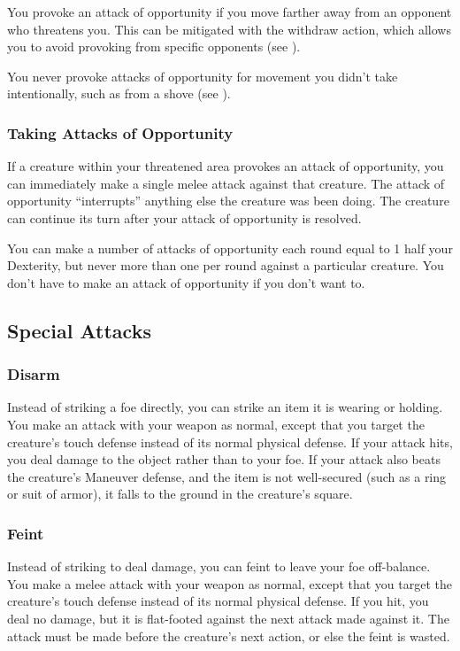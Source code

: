  You provoke an attack of opportunity if you move farther away from an opponent who threatens you. This can be mitigated with the withdraw action, which allows you to avoid provoking from specific opponents (see ).

 You never provoke attacks of opportunity for movement you didn't take intentionally, such as from a shove (see ).

\subsubsection{Taking Attacks of Opportunity}
If a creature within your threatened area provokes an attack of opportunity, you can immediately make a single melee attack against that creature. The attack of opportunity ``interrupts'' anything else the creature was been doing. The creature can continue its turn after your attack of opportunity is resolved.

You can make a number of attacks of opportunity each round equal to 1 \add half your Dexterity, but never more than one per round against a particular creature. You don't have to make an attack of opportunity if you don't want to.

\subsection{Special Attacks}

\subsubsection{Disarm}\label{Disarm}
Instead of striking a foe directly, you can strike an item it is wearing or holding. You make an attack with your weapon as normal, except that you target the creature's touch defense instead of its normal physical defense. If your attack hits, you deal damage to the object rather than to your foe. If your attack also beats the creature's Maneuver defense, and the item is not well-secured (such as a ring or suit of armor), it falls to the ground in the creature's square.

\subsubsection{Feint}\label{Feint}
Instead of striking to deal damage, you can feint to leave your foe off-balance. You make a melee attack with your weapon as normal, except that you target the creature's touch defense instead of its normal physical defense. If you hit, you deal no damage, but it is flat-footed against the next attack made against it. The attack must be made before the creature's next action, or else the feint is wasted.

